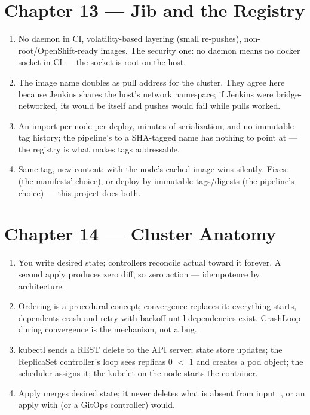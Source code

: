 \section*{Chapter 13 --- Jib and the Registry}
\begin{enumerate}
  \item No daemon in CI, volatility-based layering (small re-pushes),
  non-root/OpenShift-ready images. The security one: no daemon means
  no docker socket in CI --- the socket is root on the host.
  \item The image name doubles as pull address for the cluster. They
  agree here because Jenkins shares the host's network namespace; if
  Jenkins were bridge-networked, its  would be
  itself and pushes would fail while pulls worked.
  \item An import per node per deploy, minutes of serialization, and
  no immutable tag history; the pipeline's  to a
  SHA-tagged name has nothing to point at --- the registry is what
  makes tags addressable.
  \item Same tag, new content: with  the node's
  cached image wins silently. Fixes: 
  (the manifests' choice), or deploy by immutable tags/digests
  (the pipeline's choice) --- this project does both.
\end{enumerate}

\section*{Chapter 14 --- Cluster Anatomy}
\begin{enumerate}
  \item You write desired state; controllers reconcile actual toward
  it forever. A second apply produces zero diff, so zero action ---
  idempotence by architecture.
  \item Ordering is a procedural concept; convergence replaces it:
  everything starts, dependents crash and retry with backoff until
  dependencies exist. CrashLoop during convergence is the mechanism,
  not a bug.
  \item kubectl sends a REST delete to the API server; state store
  updates; the ReplicaSet controller's loop sees replicas 0 $<$ 1 and
  creates a pod object; the scheduler assigns it; the kubelet on the
  node starts the container.
  \item Apply merges desired state; it never deletes what is absent
  from input. , or
  an apply with  (or a GitOps controller) would.
\end{enumerate}


